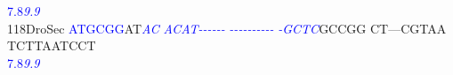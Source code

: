 \documentclass[11pt,twoside,reqno,a4paper]{article}
\begin{document}
{\hspace*{4\charwidth}\hspace*{7\charwidth}\hspace*{0\charwidth}\textcolor{blue}{7.8}\hspace*{5\charwidth}\textit{\textcolor{blue}{9.9}}\hspace*{1\charwidth}\hspace*{1\charwidth}\hspace*{1\charwidth}\hspace*{1\charwidth}\hspace*{1\charwidth}\hspace*{1\charwidth}\\
118\hspace*{1\charwidth}DroSec	\textcolor{blue}{A}\textcolor{blue}{T}\textcolor{blue}{G}\textcolor{blue}{C}\textcolor{blue}{G}\textcolor{blue}{G}AT\textit{\textcolor{blue}{A}}\textit{\textcolor{blue}{C}}	\textit{\textcolor{blue}{A}}\textit{\textcolor{blue}{C}}\textit{\textcolor{blue}{A}}\textit{\textcolor{blue}{T}}\textit{\textcolor{blue}{-}}\textit{\textcolor{blue}{-}}\textit{\textcolor{blue}{-}}\textit{\textcolor{blue}{-}}\textit{\textcolor{blue}{-}}\textit{\textcolor{blue}{-}}	\textit{\textcolor{blue}{-}}\textit{\textcolor{blue}{-}}\textit{\textcolor{blue}{-}}\textit{\textcolor{blue}{-}}\textit{\textcolor{blue}{-}}\textit{\textcolor{blue}{-}}\textit{\textcolor{blue}{-}}\textit{\textcolor{blue}{-}}\textit{\textcolor{blue}{-}}\textit{\textcolor{blue}{-}}	\textit{\textcolor{blue}{-}}\textit{\textcolor{blue}{G}}\textit{\textcolor{blue}{C}}\textit{\textcolor{blue}{T}}\textit{\textcolor{blue}{C}}GCCGG	CT---CGTAA	TCTTAATCCT	\\
\hspace*{4\charwidth}\hspace*{7\charwidth}\hspace*{0\charwidth}\textcolor{blue}{7.8}\hspace*{5\charwidth}\textit{\textcolor{blue}{9.9}}\hspace*{1\charwidth}\hspace*{1\charwidth}\hspace*{1\charwidth}\hspace*{1\charwidth}\hspace*{1\charwidth}\hspace*{1\charwidth}\\
}
\end{document}
